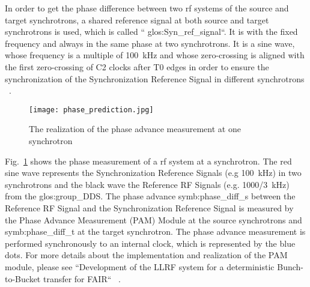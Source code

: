 In order to get the phase difference between two rf systems of the source and target synchrotrons, a shared reference signal at both source and target synchrotrons is used, which is called `` \gls{glos:Syn_ref_signal}``. It is with the fixed frequency and always in the same phase at two synchrotrons. It is a sine wave, whose frequency is a multiple of \SI{100}{kHz} and whose zero-crossing is aligned with the first zero-crossing of C2 clocks after T0 edges in order to ensure the synchronization of the Synchronization Reference Signal in different synchrotrons ~\cite{ferrand_system_2014, ferrand_system_2015}. 

\begin{figure}[H]
   \centering   
   \texttt{[image: phase\_prediction.jpg]}
   \caption{The realization of the phase advance measurement at one synchrotron}
   \label{phase_prediction}
\end{figure}

Fig.~\ref{phase_prediction} shows the phase measurement of a rf system at a synchrotron. The red sine wave represents the Synchronization Reference Signals (e.g \SI{100}{kHz}) in two synchrotrons and the black wave the Reference RF Signals (e.g. \SI{1000/3}{kHz}) from the \gls{glos:group_DDS}. The phase advance \gls{symb:phase_diff_s} between the Reference RF Signal and the Synchronization Reference Signal is measured by the Phase Advance Measurement (\gls{PAM}) Module at the source synchrotrons and \gls{symb:phase_diff_t} at the target synchrotron. The phase advance measurement is performed synchronously to an internal clock, which is represented by the blue dots. For more details about the implementation and realization of the PAM module, please see ``Development of the LLRF system for a deterministic Bunch-to-Bucket transfer for FAIR`` ~\cite{ferrand_development_????}. 
